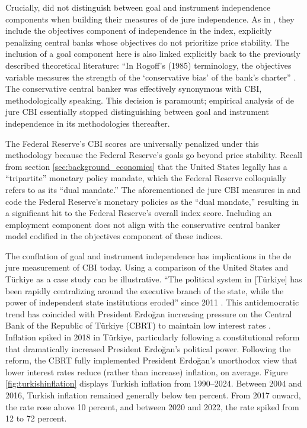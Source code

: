 \documentclass[12pt,a4paper]{article}
\begin{document}
\begin{doublespace}
Crucially, \textcite{cukierman_measuring_1992} did not distinguish between goal and instrument independence components when building their measures of de jure independence. As in \textcite{grilli_political_1991}, they include the objectives component of independence in the index, explicitly penalizing central banks whose objectives do not prioritize price stability. The inclusion of a goal component here is also linked explicitly back to the previously described theoretical literature: ``In Rogoff's (1985) terminology, the objectives variable measures the strength of the `conservative bias' of the bank's charter'' \parencite[357]{cukierman_measuring_1992}. The conservative central banker was effectively synonymous with CBI, methodologically speaking. This decision is paramount; empirical analysis of de jure CBI essentially stopped distinguishing between goal and instrument independence in its methodologies thereafter.

The Federal Reserve's CBI scores are universally penalized under this methodology because the Federal Reserve's goals go beyond price stability. Recall from section \ref{sec:background_economics} that the United States legally has a ``tripartite'' monetary policy mandate, which the Federal Reserve colloquially refers to as its ``dual mandate.'' The aforementioned de jure CBI measures in \textcite{grilli_political_1991} and \textcite{cukierman_measuring_1992} code the Federal Reserve's monetary policies as the ``dual mandate,'' resulting in a significant hit to the Federal Reserve's overall index score. Including an employment component does not align with the conservative central banker model codified in the objectives component of these indices.


The conflation of goal and instrument independence has implications in the de jure measurement of CBI today. Using a comparison of the United States and T\"urkiye as a case study can be illustrative. ``The political system in [T\"urkiye] has been rapidly centralizing around the executive branch of the state, while the power of independent state institutions eroded'' since 2011 \parencite[62]{demiralp_erosion_2019}. This antidemocratic trend has coincided with President Erdo\u{g}an increasing pressure on the Central Bank of the Republic of T\"urkiye (CBRT) to maintain low interest rates \parencite{gurkaynak_consequences_2023}. Inflation spiked in 2018 in T\"urkiye, particularly following a constitutional reform that dramatically increased President Erdo\u{g}an's political power. Following the reform, the CBRT fully implemented President Erdo\u{g}an's unorthodox view that lower interest rates reduce (rather than increase) inflation, on average. Figure \ref{fig:turkishinflation} displays Turkish inflation from 1990--2024. Between 2004 and 2016, Turkish inflation remained generally below ten percent. From 2017 onward, the rate rose above 10 percent, and between 2020 and 2022, the rate spiked from 12 to 72 percent. 


\end{doublespace}
\end{document}
